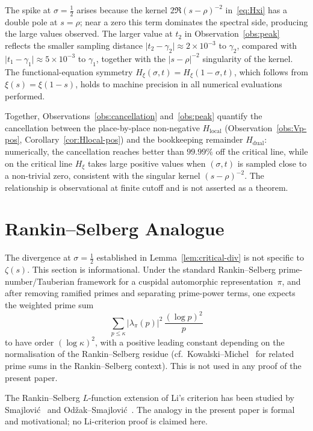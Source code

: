\documentclass[11pt]{article}
\newcommand{\Hxi}{H_{\xi}}
\newcommand{\Hlocal}{H_{\mathrm{local}}}
\newcommand{\Hdual}{H_{\mathrm{dual}}}
\begin{document}
The spike at $\sigma=\tfrac12$ arises because the kernel
$2\Re(s-\rho)^{-2}$ in~\eqref{eq:Hxi} has a double pole at
$s=\rho$; near a zero this term dominates the spectral side,
producing the large values observed.
The larger value at $t_2$ in
Observation~\ref{obs:peak} reflects the smaller sampling
distance $\lvert t_2-\gamma_2\rvert\approx 2\times 10^{-3}$
to $\gamma_2$, compared with
$\lvert t_1-\gamma_1\rvert\approx 5\times 10^{-3}$ to
$\gamma_1$, together with the $\lvert s-\rho\rvert^{-2}$
singularity of the kernel.
The functional-equation symmetry
$\Hxi(\sigma,t)=\Hxi(1-\sigma,t)$, which follows from
$\xi(s)=\xi(1-s)$, holds to machine precision in all numerical
evaluations performed.

Together, Observations~\ref{obs:cancellation}
and~\ref{obs:peak} quantify the cancellation between the
place-by-place non-negative $\Hlocal$
(Observation~\ref{obs:Vp-pos}, Corollary~\ref{cor:Hlocal-pos})
and the bookkeeping remainder $\Hdual$: numerically, the
cancellation reaches better than $99.99\%$ off the critical
line, while on the critical line $\Hxi$ takes large positive
values when $(\sigma,t)$ is sampled close to a non-trivial
zero, consistent with the singular kernel $(s-\rho)^{-2}$.
The relationship is observational at finite cutoff and is
not asserted as a theorem.

\section{Rankin--Selberg Analogue}
\label{sec:rs}

The divergence at $\sigma=\tfrac12$ established in
Lemma~\ref{lem:critical-div} is not specific to $\zeta(s)$.
This section is informational.
Under the standard Rankin--Selberg prime-number/Tauberian
framework for a cuspidal automorphic representation~$\pi$,
and after removing ramified primes and separating prime-power
terms, one expects the weighted prime sum
\[
\sum_{p\le\kappa}\lvert\lambda_{\pi}(p)\rvert^{2}\,
\frac{(\log p)^{2}}{p}
\]
to have order $(\log\kappa)^{2}$, with a positive leading
constant depending on the normalisation of the
Rankin--Selberg residue
(cf.\ Kowalski--Michel~\cite{KowalskiMichel} for related
prime sums in the Rankin--Selberg context).
This is not used in any proof of the present paper.

The Rankin--Selberg $L$-function extension of Li's
criterion has been studied by
Smajlovi\'c~\cite{Smajlovic10}
and Od\v{z}ak--Smajlovi\'c~\cite{OdzakSmajlovic10}.
The analogy in the present paper is formal and
motivational; no Li-criterion proof is claimed here.
\end{document}
